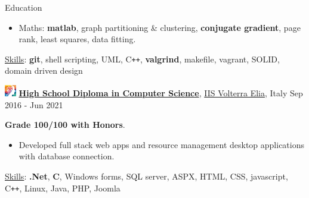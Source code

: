 \documentclass{cv} %
\def\intraexpvspace{0.15cm}
\def\titlelistvspace{-0.15cm}
\begin{document}
\begin{rSection}{Education}
\begin{itemize}
        \item Maths:
              \textbf{matlab},
              graph partitioning \& clustering,
              \textbf{conjugate gradient},
              page rank,
              least squares,
              data fitting.
    \end{itemize}
    \vspace*{-0.1cm}\hspace*{0.5cm}\underline{Skills}:
    \textbf{git},
    shell scripting,
    UML,
    C\texttt{++},
    \textbf{valgrind},
    makefile,
    vagrant,
    SOLID,
    domain driven design
    \vspace{\intraexpvspace}

    \includegraphics[width=0.5cm, trim={0cm 1cm 0cm 0cm}]{iisve-icon.png}
    {\bf \underline{High School Diploma in Computer Science}},
    \href{https://www.istitutovolterraelia.it/}{IIS Volterra Elia},
    Italy
    \hfill{Sep 2016 - Jun 2021}

    \textbf{Grade 100/100 with Honors}.

    \vspace{\titlelistvspace}\begin{itemize}
        \itemsep -3pt {}
        \item Developed full stack web apps and resource management desktop applications with database connection.
    \end{itemize}

    \vspace*{-0.1cm}\hspace*{0.5cm}\underline{Skills}:
    \textbf{.Net},
    \textbf{C\text{\#}},
    Windows forms,
    SQL server,
    ASPX,
    HTML, CSS, javascript,
    C\texttt{++},
    Linux,
    Java,
    PHP,
    Joomla
\end{rSection}
\end{document}
